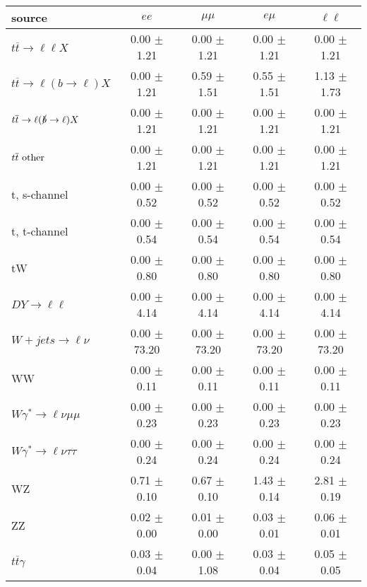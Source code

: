 \begin{tabular}{l|cccc} \hline\hline
source & $ee$ & $\mu\mu$ & $e\mu$ & $\ell\ell $ \\
\hline
$t\overline{t} \rightarrow \ell \ell X$ &  0.00 $\pm$  1.21 &  0.00 $\pm$  1.21 &  0.00 $\pm$  1.21 &  0.00 $\pm$  1.21 \\
$t\overline{t} \rightarrow \ell (b \rightarrow \ell) X$ &  0.00 $\pm$  1.21 &  0.59 $\pm$  1.51 &  0.55 $\pm$  1.51 &  1.13 $\pm$  1.73 \\
$t\overline{t} \rightarrow \ell (\slashed b \rightarrow \ell) X$ &  0.00 $\pm$  1.21 &  0.00 $\pm$  1.21 &  0.00 $\pm$  1.21 &  0.00 $\pm$  1.21 \\
        $t\overline{t}\ \rm{other}$ &  0.00 $\pm$  1.21 &  0.00 $\pm$  1.21 &  0.00 $\pm$  1.21 &  0.00 $\pm$  1.21 \\
\hline
                       t, s-channel &  0.00 $\pm$  0.52 &  0.00 $\pm$  0.52 &  0.00 $\pm$  0.52 &  0.00 $\pm$  0.52 \\
                       t, t-channel &  0.00 $\pm$  0.54 &  0.00 $\pm$  0.54 &  0.00 $\pm$  0.54 &  0.00 $\pm$  0.54 \\
                                 tW &  0.00 $\pm$  0.80 &  0.00 $\pm$  0.80 &  0.00 $\pm$  0.80 &  0.00 $\pm$  0.80 \\
\hline
         $DY \rightarrow \ell \ell$ &  0.00 $\pm$  4.14 &  0.00 $\pm$  4.14 &  0.00 $\pm$  4.14 &  0.00 $\pm$  4.14 \\
      $W+jets \rightarrow \ell \nu$ &  0.00 $\pm$ 73.20 &  0.00 $\pm$ 73.20 &  0.00 $\pm$ 73.20 &  0.00 $\pm$ 73.20 \\
                                 WW &  0.00 $\pm$  0.11 &  0.00 $\pm$  0.11 &  0.00 $\pm$  0.11 &  0.00 $\pm$  0.11 \\
\hline
$W\gamma^{*} \rightarrow \ell \nu \mu\mu$ &  0.00 $\pm$  0.23 &  0.00 $\pm$  0.23 &  0.00 $\pm$  0.23 &  0.00 $\pm$  0.23 \\
$W\gamma^{*} \rightarrow \ell \nu \tau\tau$ &  0.00 $\pm$  0.24 &  0.00 $\pm$  0.24 &  0.00 $\pm$  0.24 &  0.00 $\pm$  0.24 \\
                                 WZ &  0.71 $\pm$  0.10 &  0.67 $\pm$  0.10 &  1.43 $\pm$  0.14 &  2.81 $\pm$  0.19 \\
                                 ZZ &  0.02 $\pm$  0.00 &  0.01 $\pm$  0.00 &  0.03 $\pm$  0.01 &  0.06 $\pm$  0.01 \\
\hline
              $t\overline{t}\gamma$ &  0.03 $\pm$  0.04 &  0.00 $\pm$  1.08 &  0.03 $\pm$  0.04 &  0.05 $\pm$  0.05 \\

\end{tabular}
